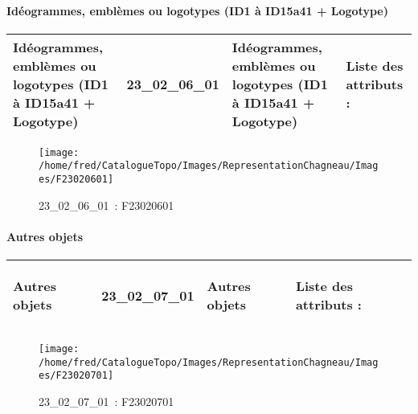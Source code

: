 \documentclass[12pt,titlepage,oneside]{book}
\begin{document}
\paragraph{Idéogrammes, emblèmes ou logotypes (ID1 à ID15a41 + Logotype)}
\noindent
\vspace{\baselineskip}

\renewcommand{\arraystretch}{1.2}
\begin{supertabular}{|p{10cm}|c|p{13cm}|p{12cm}|}
 Idéogrammes, emblèmes ou logotypes (ID1 à ID15a41 + Logotype) & 23\_02\_06\_01 & Idéogrammes, emblèmes ou logotypes (ID1 à ID15a41 + Logotype) & Liste des attributs :
\begin{enumerate}
\end{enumerate}
\\
\hline
\end{supertabular}
\begin{figure}[h!]
  \hfill         %
  \begin{minipage}[t]{3cm}
    \begin{center}
      \texttt{[image: /home/fred/CatalogueTopo/Images/RepresentationChagneau/Images/F23020601]}
      \caption[~23\_02\_06\_01]{\small{23\_02\_06\_01~:} \tiny{F23020601}}\label{F23020601}
    \end{center}
  \end{minipage}
\end{figure}


\paragraph{Autres objets}
\noindent
\vspace{\baselineskip}

\renewcommand{\arraystretch}{1.2}
\begin{supertabular}{|p{10cm}|c|p{13cm}|p{12cm}|}
 Autres objets & 23\_02\_07\_01 & Autres objets & Liste des attributs :
\begin{enumerate}
\end{enumerate}
\\
\hline
\end{supertabular}
\begin{figure}[h!]
  \hfill         %
  \begin{minipage}[t]{3cm}
    \begin{center}
      \texttt{[image: /home/fred/CatalogueTopo/Images/RepresentationChagneau/Images/F23020701]}
      \caption[~23\_02\_07\_01]{\small{23\_02\_07\_01~:} \tiny{F23020701}}\label{F23020701}
    \end{center}
  \end{minipage}
\end{figure}
\end{document}
